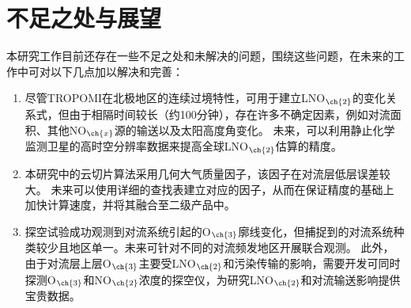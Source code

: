 \section{不足之处与展望}

本研究工作目前还存在一些不足之处和未解决的问题，围绕这些问题，在未来的工作中可对以下几点加以解决和完善：

\begin{enumerate}[label=（\arabic*）, labelindent=\parindent, nosep, leftmargin=0pt, widest=0, itemindent=*, topsep=0pt, partopsep=0pt, parsep=0pt]

\item 尽管TROPOMI在北极地区的连续过境特性，可用于建立LNO$_{\ch{2}}$的变化关系式，但由于相隔时间较长（约100分钟），存在许多不确定因素，例如对流面积、其他NO$_{\ch{x}}$源的输送以及太阳高度角变化。
未来，可以利用静止化学监测卫星的高时空分辨率数据来提高全球LNO$_{\ch{2}}$估算的精度。


\item 本研究中的云切片算法采用几何大气质量因子，该因子在对流层低层误差较大。
未来可以使用详细的查找表建立对应的因子，从而在保证精度的基础上加快计算速度，并将其融合至二级产品中。

\item 探空试验成功观测到对流系统引起的O$_{\ch{3}}$廓线变化，但捕捉到的对流系统种类较少且地区单一。未来可针对不同的对流频发地区开展联合观测。
此外，由于对流层上层O$_{\ch{3}}$主要受LNO$_{\ch{2}}$和污染传输的影响，需要开发可同时探测O$_{\ch{3}}$和NO$_{\ch{2}}$浓度的探空仪，为研究LNO$_{\ch{2}}$和对流输送影响提供宝贵数据。

\end{enumerate}
